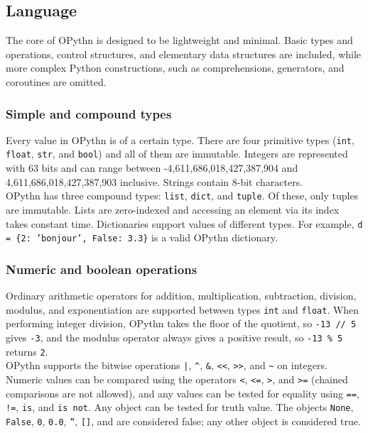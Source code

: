 \documentclass[11pt, twoside]{article}
\newcommand{\ms}{\texttt}
\begin{document}
    \subsection{Language}
    The core of OPythn is designed to be lightweight and minimal. Basic types and operations, control structures, and elementary data structures are included, while more complex Python constructions, such as comprehensions, generators, and coroutines are omitted.
    \subsubsection{Simple and compound types}
    Every value in OPythn is of a certain type. There are four primitive types (\ms{int}, \ms{float}, \ms{str}, and \ms{bool}) and all of them are immutable. Integers are represented with 63 bits and can range between -4,611,686,018,427,387,904 and 4,611,686,018,427,387,903 inclusive. Strings contain 8-bit characters.\\
    \indent OPythn has three compound types: \ms{list}, \ms{dict}, and \ms{tuple}. Of these, only tuples are immutable. Lists are zero-indexed and accessing an element via its index takes constant time. Dictionaries support values of different types. For example, \ms{d = \{2: 'bonjour', False: 3.3\}} is a valid OPythn dictionary.
   
    \subsubsection{Numeric and boolean operations}
    Ordinary arithmetic operators for addition, multiplication, subtraction, division, modulus, and exponentiation are supported between types \ms{int} and \ms{float}. When performing integer division, OPythn takes the floor of the quotient, so \ms{-13 // 5} gives \ms{-3}, and the modulus operator always gives a positive result, so \ms{-13 \% 5} returns \ms{2}.\\
    \indent OPythn supports the bitwise operations \ms{|}, \ms{\^}, \ms{\&}, \ms{<<}, \ms{>>}, and \ms{\~} on integers. Numeric values can be compared using the operators \ms{<}, \ms{<=}, \ms{>}, and \ms{>=} (chained comparisons are not allowed), and any values can be tested for equality using \ms{==}, \ms{!=}, \ms{is}, and \ms{is not}. Any object can be tested for truth value. The objects \ms{None}, \ms{False}, \ms{0}, \ms{0.0}, \ms{''}, \ms{[]}, and \ms{\string{\string}} are considered false; any other object is considered true.
\end{document}
